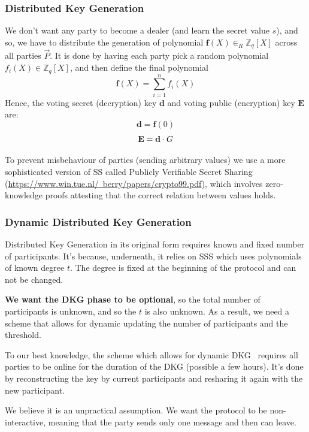\documentclass{article}
\begin{document}
\subsubsection*{Distributed Key Generation}
We don't want any party to become a dealer (and learn the secret value $s$), and so, we have to distribute the generation of polynomial $\mathbf{f}(X) \in_R \mathbb{Z}_q[X]$ across all parties $\vec{P}$. It is done by having each party pick a random polynomial $f_{i}(X) \in \mathbb{Z}_q[X]$, and then define the final polynomial \[\mathbf{f}(X)=\sum_{i=1}^{n}f_i(X)\] Hence, the voting secret (decryption) key $\mathbf{d}$ and voting public (encryption) key $\mathbf{E}$ are: $$\mathbf{d}=\mathbf{f}(0)$$ $$\mathbf{E}=\mathbf{d} \cdot G$$ 

To prevent misbehaviour of parties (sending arbitrary values) we use a more sophisticated version of SS called Publicly Verifiable Secret Sharing (\href{PVSS}{https://www.win.tue.nl/~berry/papers/crypto99.pdf}), which involves zero-knowledge proofs attesting that the correct relation between values holds.


\subsubsection*{Dynamic Distributed Key Generation}
Distributed Key Generation in its original form requires known and fixed number of participants. It's because, underneath, it relies on SSS which uses polynomials of known degree $t$. The degree is fixed at the beginning of the protocol and can not be changed.

\textbf{We want the DKG phase to be optional}, so the total number of participants is unknown, and so the $t$ is also unknown. As a result, we need a scheme that allows for dynamic updating the number of participants and the threshold.

To our best knowledge, the scheme which allows for dynamic DKG~\cite{delerableeDynamicThresholdPublickey2008} requires all parties to be online for the duration of the DKG (possible a few hours). It's done by reconstructing the key by current participants and resharing it again with the new participant.

We believe it is an unpractical assumption. We want the protocol to be non-interactive, meaning that the party sends only one message and then can leave.

\end{document}
